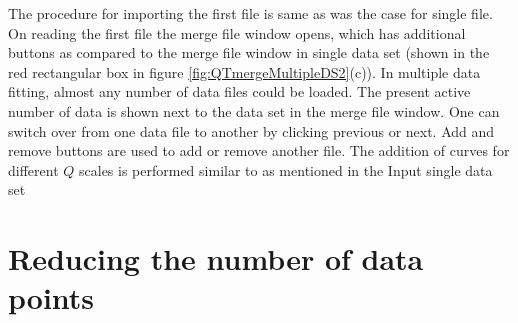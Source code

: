 The procedure for importing the first file is same as was the case
for single file. On reading the first file the merge file window
opens, which has additional buttons as compared to the merge file
window in single data set (shown in the red rectangular box in
figure \ref{fig:QTmergeMultipleDS2}(c)). In multiple data fitting,
almost any number of data files could be loaded. The present active
number of data is shown next to the data set in the merge file
window. One can switch over from one data file to another by
clicking previous or next. Add and remove buttons are used to add or
remove another file. The addition of curves for different $Q$ scales
is performed similar to as mentioned in the Input single data set


\section{Reducing the number of data points}

